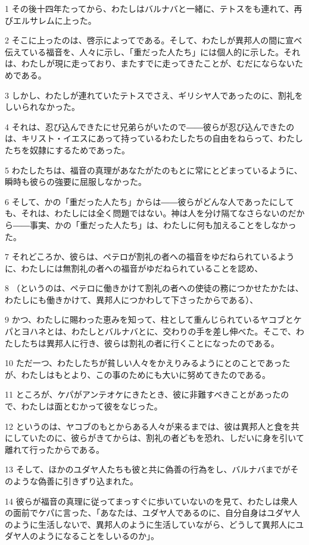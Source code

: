 \par 1 その後十四年たってから、わたしはバルナバと一緒に、テトスをも連れて、再びエルサレムに上った。
\par 2 そこに上ったのは、啓示によってである。そして、わたしが異邦人の間に宣べ伝えている福音を、人々に示し、「重だった人たち」には個人的に示した。それは、わたしが現に走っており、またすでに走ってきたことが、むだにならないためである。
\par 3 しかし、わたしが連れていたテトスでさえ、ギリシヤ人であったのに、割礼をしいられなかった。
\par 4 それは、忍び込んできたにせ兄弟らがいたので――彼らが忍び込んできたのは、キリスト・イエスにあって持っているわたしたちの自由をねらって、わたしたちを奴隷にするためであった。
\par 5 わたしたちは、福音の真理があなたがたのもとに常にとどまっているように、瞬時も彼らの強要に屈服しなかった。
\par 6 そして、かの「重だった人たち」からは――彼らがどんな人であったにしても、それは、わたしには全く問題ではない。神は人を分け隔てなさらないのだから――事実、かの「重だった人たち」は、わたしに何も加えることをしなかった。
\par 7 それどころか、彼らは、ペテロが割礼の者への福音をゆだねられているように、わたしには無割礼の者への福音がゆだねられていることを認め、
\par 8 （というのは、ペテロに働きかけて割礼の者への使徒の務につかせたかたは、わたしにも働きかけて、異邦人につかわして下さったからである）、
\par 9 かつ、わたしに賜わった恵みを知って、柱として重んじられているヤコブとケパとヨハネとは、わたしとバルナバとに、交わりの手を差し伸べた。そこで、わたしたちは異邦人に行き、彼らは割礼の者に行くことになったのである。
\par 10 ただ一つ、わたしたちが貧しい人々をかえりみるようにとのことであったが、わたしはもとより、この事のためにも大いに努めてきたのである。
\par 11 ところが、ケパがアンテオケにきたとき、彼に非難すべきことがあったので、わたしは面とむかって彼をなじった。
\par 12 というのは、ヤコブのもとからある人々が来るまでは、彼は異邦人と食を共にしていたのに、彼らがきてからは、割礼の者どもを恐れ、しだいに身を引いて離れて行ったからである。
\par 13 そして、ほかのユダヤ人たちも彼と共に偽善の行為をし、バルナバまでがそのような偽善に引きずり込まれた。
\par 14 彼らが福音の真理に従ってまっすぐに歩いていないのを見て、わたしは衆人の面前でケパに言った、「あなたは、ユダヤ人であるのに、自分自身はユダヤ人のように生活しないで、異邦人のように生活していながら、どうして異邦人にユダヤ人のようになることをしいるのか」。
